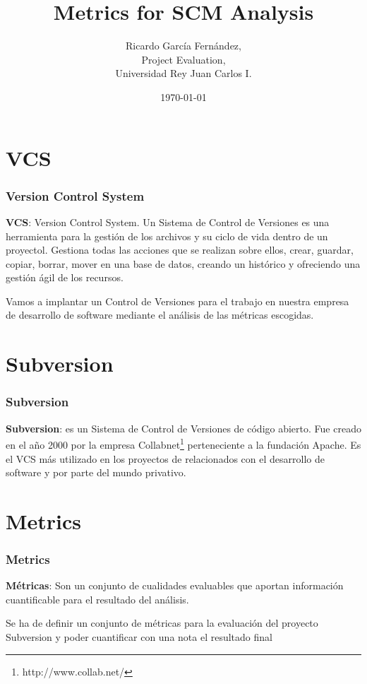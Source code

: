 \documentclass[xcolor=dvipsnames]{beamer}
\title{Metrics for SCM Analysis}
\author{Ricardo Garc\'ia Fern\'andez,\\
        Project Evaluation,\\
        Universidad Rey Juan Carlos I.}
\date{\today}
\begin{document}

\section[Index]{}
\begin{frame}[allowframebreaks]
\tableofcontents
\end{frame}

\section{VCS}
\begin{frame}[allowframebreaks]
\frametitle{Version Control System}

\textbf{VCS}: Version Control System. Un Sistema de Control de Versiones es una herramienta para la gesti\'on de los archivos y su ciclo de vida dentro de un proyectol. Gestiona todas las acciones que se realizan sobre ellos, crear, guardar, copiar, borrar, mover en una base de datos, creando un hist\'orico y ofreciendo una gesti\'on \'agil de los recursos.

Vamos a implantar un Control de Versiones para el trabajo en nuestra empresa de desarrollo de software mediante el an\'alisis de las m\'etricas escogidas.

\end{frame}

\section{Subversion}
\begin{frame}[allowframebreaks]
\frametitle{Subversion}
\textbf{Subversion}: es un Sistema de Control de Versiones de c\'odigo abierto.
Fue creado en el a\~no 2000 por la empresa Collabnet\footnote{http://www.collab.net/} perteneciente a la fundaci\'on Apache.
Es el VCS m\'as utilizado en los proyectos de relacionados con el desarrollo de software y por parte del mundo privativo.
\end{frame}

\section{Metrics}
\begin{frame}[allowframebreaks]
\frametitle{Metrics}
\textbf{M\'etricas}: Son un conjunto de cualidades evaluables que aportan informaci\'on cuantificable para el resultado del an\'alisis.

\par Se ha de definir un conjunto de m\'etricas para la evaluaci\'on del proyecto Subversion y poder cuantificar con una nota el resultado final
\end{frame}
\end{document}
